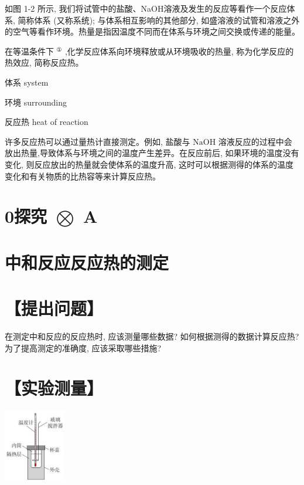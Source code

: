 \documentclass[10pt]{article}
\begin{document}
如图 1-2 所示, 我们将试管中的盐酸、NaOH溶液及发生的反应等看作一个反应体系, 简称体系 (又称系统); 与体系相互影响的其他部分, 如盛溶液的试管和溶液之外的空气等看作环境。热量是指因温度不同而在体系与环境之间交换或传递的能量。

在等温条件下 \({}^{\text{①}}\) ,化学反应体系向环境释放或从环境吸收的热量, 称为化学反应的热效应, 简称反应热。

\begin{mdframed}

体系 system

环境 surrounding

反应热 heat of reaction

\end{mdframed}

许多反应热可以通过量热计直接测定。例如, 盐酸与 \(\mathrm{{NaOH}}\) 溶液反应的过程中会放出热量,导致体系与环境之间的温度产生差异。在反应前后, 如果环境的温度没有变化, 则反应放出的热量就会使体系的温度升高, 这时可以根据测得的体系的温度变化和有关物质的比热容等来计算反应热。


\section*{0探究 \(\bigotimes\) A}

\section*{中和反应反应热的测定}

\section*{【提出问题】}

在测定中和反应的反应热时, 应该测量哪些数据? 如何根据测得的数据计算反应热? 为了提高测定的准确度, 应该采取哪些措施?

\section*{【实验测量】}

\begin{center}
\includegraphics[max width=0.2\textwidth]{images/0190da9d-8bfd-732f-bc2c-0b21d0f13b91_10_410613.jpg}
\end{center}
\end{document}
